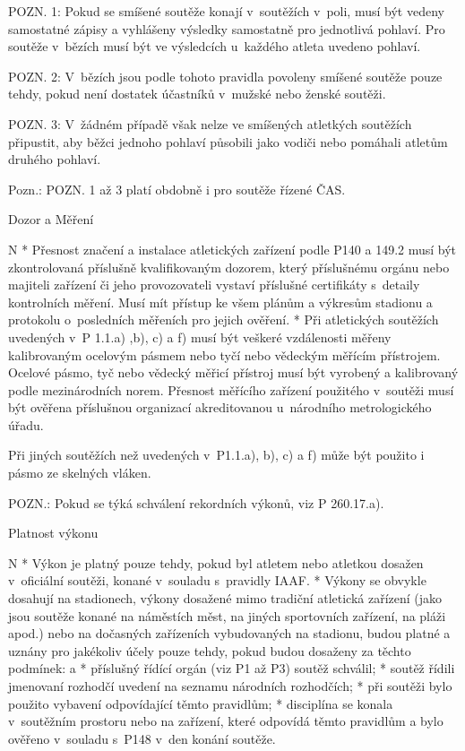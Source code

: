 POZN. 1: Pokud se smíšené soutěže konají v~soutěžích v~poli, musí být vedeny samostatné zápisy a vyhlášeny výsledky samostatně pro jednotlivá pohlaví. Pro soutěže v~bězích musí být ve výsledcích u~každého atleta uvedeno pohlaví.

POZN. 2: V~bězích jsou podle tohoto pravidla povoleny smíšené soutěže pouze tehdy, pokud není dostatek účastníků v~mužské nebo ženské soutěži.

POZN. 3: V~žádném případě však nelze ve smíšených atletkých soutěžích připustit, aby běžci jednoho pohlaví působili jako vodiči nebo pomáhali atletům druhého pohlaví.

Pozn.: POZN. 1 až 3 platí obdobně i pro soutěže řízené ČAS.
\enditems

\secc Dozor a Měření

\begitems \style N
* Přesnost značení a instalace atletických zařízení podle P140 a 149.2 musí být zkontrolovaná příslušně kvalifikovaným dozorem, který příslušnému orgánu nebo majiteli zařízení či jeho provozovateli vystaví příslušné certifikáty s~detaily kontrolních měření. Musí mít přístup ke všem plánům a výkresům stadionu a protokolu o~posledních měřeních pro jejich ověření.
* Při atletických  soutěžích uvedených v~P 1.1.a) ,b), c) a f) musí být veškeré vzdálenosti měřeny kalibrovaným ocelovým pásmem nebo tyčí nebo vědeckým měřícím přístrojem. Ocelové pásmo, tyč nebo vědecký měřicí přístroj musí být vyrobený a kalibrovaný podle mezinárodních norem. Přesnost měřícího zařízení použitého v~soutěži musí být ověřena příslušnou organizací akreditovanou u~národního metrologického úřadu.

Při jiných soutěžích než uvedených v~P1.1.a), b), c) a f) může být použito i pásmo ze skelných vláken.

POZN.: Pokud se týká schválení rekordních výkonů, viz P 260.17.a).
\enditems

\secc Platnost výkonu

\begitems \style N
* Výkon je platný pouze tehdy, pokud byl atletem nebo atletkou dosažen v~oficiální soutěži, konané v~souladu s~pravidly IAAF.
* Výkony se obvykle dosahují na stadionech, výkony dosažené mimo tradiční atletická zařízení (jako jsou soutěže konané na náměstích měst, na jiných sportovních zařízení, na pláži apod.) nebo na dočasných zařízeních vybudovaných na stadionu, budou platné a uznány pro jakékoliv účely pouze tehdy, pokud budou dosaženy za těchto podmínek:
  \begitems \style a
  * příslušný řídící orgán (viz P1 až P3) soutěž schválil;
  * soutěž řídili jmenovaní rozhodčí uvedení na seznamu národních rozhodčích;
  * při soutěži bylo použito vybavení odpovídající těmto pravidlům;
  * disciplína se konala v~soutěžním prostoru nebo na zařízení, které odpovídá těmto pravidlům a bylo ověřeno v~souladu s~P148 v~den konání soutěže.

